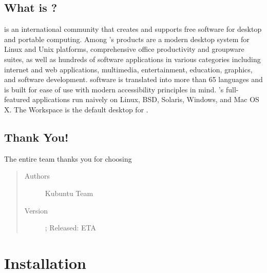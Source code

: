 \documentclass[letterpaper,10pt,english]{sphinxmanual}
\begin{document}
\section{What is ?}
\label{\detokenize{welcome:what-is-kde}}
 is an international community that creates and supports free software for desktop and portable computing. Among ’s products are a modern desktop system for Linux and Unix platforms, comprehensive office productivity and groupware suites, as well as hundreds of software applications in various categories including internet and web applications, multimedia, entertainment, education, graphics, and software development.  software is translated into more than 65 languages and is built for ease of use with modern accessibility principles in mind. ’s full-featured applications run naively on Linux, BSD, Solaris, Windows, and Mac OS X. The  Workspace is the default desktop for .


\section{Thank You!}
\label{\detokenize{welcome:thank-you}}
The entire  team thanks you for choosing 
\begin{quote}\begin{description}
\item[{Authors}] \leavevmode
Kubuntu Team

\item[{Version}]  ; Released: ETA

\end{description}\end{quote}


\chapter{Installation}
\label{\detokenize{docs/installation:installation}}\label{\detokenize{docs/installation::doc}}
\end{document}
